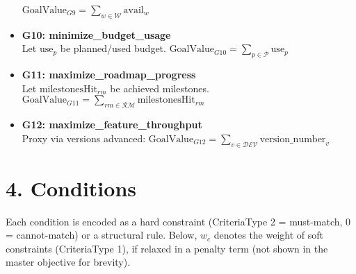 \documentclass[11pt,a4paper]{article}
\begin{document}
\begin{itemize}[leftmargin=2em]
  $\displaystyle \text{GoalValue}_{G9}=\sum_{w\in\mathcal{W}} \text{avail}_w$
  \item \textbf{G10: minimize\_budget\_usage} \\
  Let $\text{use}_p$ be planned/used budget. $\displaystyle \text{GoalValue}_{G10}=\sum_{p\in\mathcal{P}} \text{use}_p$
  \item \textbf{G11: maximize\_roadmap\_progress} \\
  Let $\text{milestonesHit}_{rm}$ be achieved milestones. $\displaystyle \text{GoalValue}_{G11}=\sum_{rm\in\mathcal{RM}} \text{milestonesHit}_{rm}$
  \item \textbf{G12: maximize\_feature\_throughput} \\
  Proxy via versions advanced: $\displaystyle \text{GoalValue}_{G12}=\sum_{v\in\mathcal{DEV}} \text{version\_number}_v$
\end{itemize}

\section{4. Conditions}
Each condition is encoded as a hard constraint (CriteriaType 2 = must-match, 0 = cannot-match) or a structural rule. Below, $w_c$ denotes the weight of soft constraints (CriteriaType 1), if relaxed in a penalty term (not shown in the master objective for brevity).
\end{document}
